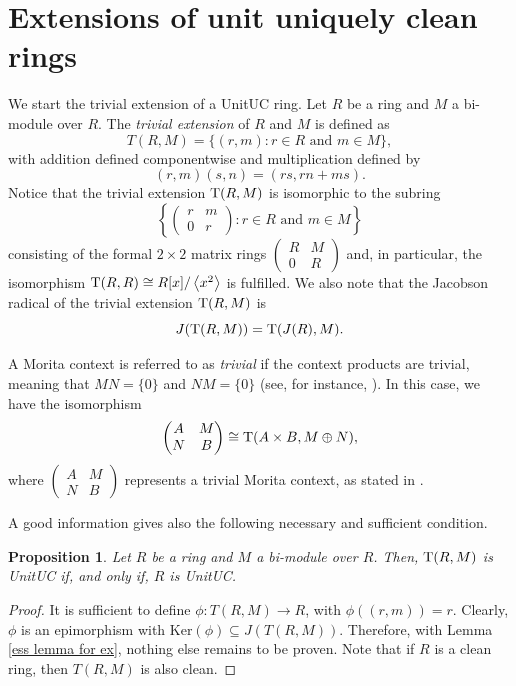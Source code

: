 \documentclass[12pt]{amsart}
\newtheorem{proposition}[theorem]{Proposition}
\theoremstyle{definition}
\begin{document}
\section{ Extensions of unit uniquely clean rings }

We start the trivial extension of a   UnitUC ring. Let $R$ be a ring and $M$ a bi-module over $R$. The {\it trivial extension} of $R$ and $M$ is defined as
$$T(R, M) = \{(r, m) : r \in R \text{ and } m \in M\},$$
with addition defined componentwise and multiplication defined by
$$(r, m)(s, n) = (rs, rn + ms).$$
Notice that the trivial extension ${\rm T}(R, M)$ is isomorphic to the subring
$$\left\{ \begin{pmatrix} r & m \\ 0 & r \end{pmatrix} : r \in R \text{ and } m \in M \right\}$$
consisting of the formal $2 \times 2$ matrix rings $\begin{pmatrix} R & M \\ 0 & R \end{pmatrix}$ and, in particular, the isomorphism ${\rm T}(R, R) \cong R[x]/\left\langle x^2 \right\rangle$ is fulfilled. We also note that the Jacobson radical of the trivial extension ${\rm T}(R, M)$ is $$J({\rm T}(R, M)) = {\rm T}(J(R), M).$$

A Morita context is referred to as {\it trivial} if the context products are trivial, meaning that $MN = \{0\}$ and $NM = \{0\}$ (see, for instance, \cite[p. 1993]{mar}). In this case, we have the isomorphism
$$\begin{pmatrix} A & M \\ N & B \end{pmatrix} \cong {\rm T}(A \times B, M\oplus N),$$
where $\begin{pmatrix} A & M \\ N & B \end{pmatrix}$ represents a trivial Morita context, as stated in \cite{kos1}.

	
A good information gives also the following necessary and sufficient condition.

\begin{proposition}\label{pro3.41}
Let $R$ be a ring and $M$ a bi-module over $R$. Then, ${\rm T}(R, M)$ is   UnitUC if, and only if, $R$ is  UnitUC.
\end{proposition}

\begin{proof}
It is sufficient to define $\phi: T(R,M) \longrightarrow R$, with $\phi((r,m))=r$. Clearly, $\phi$ is an epimorphism with $\text{Ker}(\phi) \subseteq J(T(R,M))$. Therefore, with Lemma \ref{ess lemma for ex}, nothing else remains to be proven. Note that if $R$ is a clean ring, then $T(R,M)$ is also clean.
\end{proof}
\end{document}
